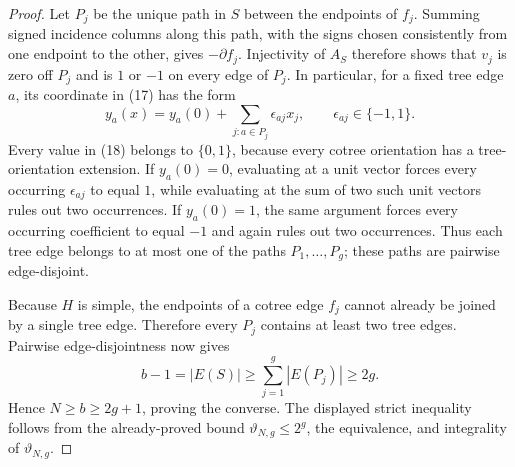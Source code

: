\documentclass{article}
\begin{document}
\begin{proof}
Let \(P_j\) be the unique path in \(S\) between the endpoints of \(f_j\).  Summing signed incidence columns along this path, with the signs chosen consistently from one endpoint to the other, gives \(-\partial f_j\).  Injectivity of \(A_S\) therefore shows that \(v_j\) is zero off \(P_j\) and is \(1\) or \(-1\) on every edge of \(P_j\).  In particular, for a fixed tree edge \(a\), its coordinate in (17) has the form
\[
 y_a(x)=y_a(0)+\sum_{j:a\in P_j}\epsilon_{aj}x_j,
 \qquad \epsilon_{aj}\in\{-1,1\}.
\tag{18}
\]
Every value in (18) belongs to \(\{0,1\}\), because every cotree orientation has a tree-orientation extension.  If \(y_a(0)=0\), evaluating at a unit vector forces every occurring \(\epsilon_{aj}\) to equal \(1\), while evaluating at the sum of two such unit vectors rules out two occurrences.  If \(y_a(0)=1\), the same argument forces every occurring coefficient to equal \(-1\) and again rules out two occurrences.  Thus each tree edge belongs to at most one of the paths \(P_1,\ldots,P_g\); these paths are pairwise edge-disjoint.

Because \(H\) is simple, the endpoints of a cotree edge \(f_j\) cannot already be joined by a single tree edge.  Therefore every \(P_j\) contains at least two tree edges.  Pairwise edge-disjointness now gives
\[
 b-1=|E(S)|
 \geq\sum_{j=1}^g|E(P_j)|
 \geq2g.
\tag{19}
\]
Hence \(N\geq b\geq2g+1\), proving the converse.  The displayed strict inequality follows from the already-proved bound \(\vartheta_{N,g}\leq2^g\), the equivalence, and integrality of \(\vartheta_{N,g}\).
\end{proof}
\end{document}
